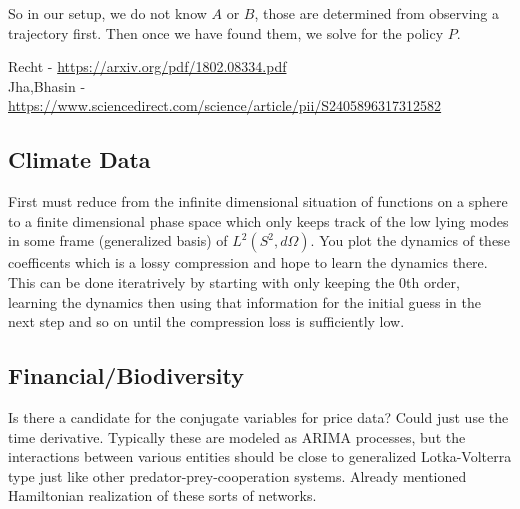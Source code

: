 \documentclass[a4paper,landscape]{article}
\theoremstyle{change}
\theoremstyle{nonumberplain}
\numberwithin{equation}{section}
\begin{document}
So in our setup, we do not know $A$ or $B$, those are determined from observing a trajectory first. Then once we have found them, we solve for the policy $P$.

Recht - \url{https://arxiv.org/pdf/1802.08334.pdf}\\
Jha,Bhasin - \url{https://www.sciencedirect.com/science/article/pii/S2405896317312582}

\subsection{Climate Data}

First must reduce from the infinite dimensional situation of functions on a sphere to a finite dimensional phase space which only keeps track of the low lying modes in some frame (generalized basis) of $L^2 ( S^2 , d \Omega )$. You plot the dynamics of these coefficents which is a lossy compression and hope to learn the dynamics there. This can be done iteratrively by starting with only keeping the 0th order, learning the dynamics then using that information for the initial guess in the next step and so on until the compression loss is sufficiently low.

\subsection{Financial/Biodiversity}

Is there a candidate for the conjugate variables for price data? Could just use the time derivative. Typically these are modeled as ARIMA processes, but the interactions between various entities should be close to generalized Lotka-Volterra type just like other predator-prey-cooperation systems. Already mentioned Hamiltonian realization of these sorts of networks.
\end{document}
